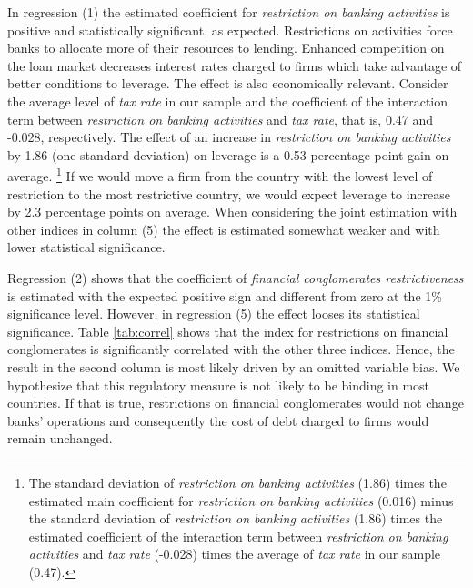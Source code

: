 \documentclass[12pt]{article}
\begin{document}
	  In regression (1) the estimated coefficient for \textit{restriction on banking activities} is positive and statistically significant, as expected. Restrictions on activities force banks to allocate more of their resources to lending. Enhanced competition on the loan market decreases interest rates charged to firms which take advantage of better conditions to leverage. The effect is also economically relevant. Consider the average level of \textit{tax rate} in our sample and the coefficient of the interaction term between \textit{restriction on banking activities} and \textit{tax rate}, that is, 0.47 and -0.028, respectively. The effect of an increase in \textit{restriction on banking activities} by 1.86 (one standard deviation) on leverage is a 0.53 percentage point gain on average. \footnote{The standard deviation of \textit{restriction on banking activities} (1.86) times the estimated main coefficient for \textit{restriction on banking activities} (0.016) minus the standard deviation of \textit{restriction on banking activities} (1.86) times the estimated coefficient of the interaction term between \textit{restriction on banking activities} and \textit{tax rate} (-0.028) times the average of \textit{tax rate} in our sample (0.47).} If we would move a firm from the country with the lowest level of restriction to the most restrictive country, we would expect leverage to increase by 2.3 percentage points on average.  When considering the joint estimation with other indices in column (5) the effect is estimated somewhat weaker and with lower statistical significance.
	
	  Regression (2) shows that the coefficient of \textit{financial conglomerates restrictiveness} is estimated with the expected positive sign and different from zero at the 1\% significance level. However, in regression (5) the effect looses its statistical significance. Table \ref{tab:correl} shows that the index for restrictions on financial conglomerates is significantly correlated with the other three indices. Hence, the result in the second column is most likely driven by an omitted variable bias. We hypothesize that this regulatory measure is not likely to be binding in most countries. If that is true, restrictions on financial conglomerates would not change banks' operations and consequently the cost of debt charged to firms would remain unchanged. 
	
\end{document}
